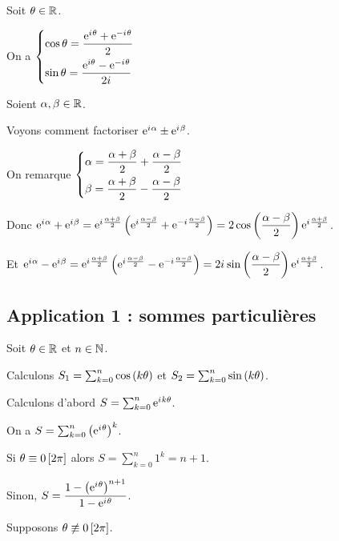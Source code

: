 \begin{prop}
Soit \(\theta\in\mathbb{R}\).

On a \(\begin{dcases}\cos\theta=\dfrac{\mathrm{e}^{i\mkern1mu\theta}+\mathrm{e}^{-i\mkern1mu\theta}}{2} \\ \sin\theta=\dfrac{\mathrm{e}^{i\theta}-\mathrm{e}^{-i\mkern1mu\theta}}{2i\mkern1mu}\end{dcases}\)
\end{prop}

\begin{rem}
Soient \(\alpha,\beta\in\mathbb{R}\).

Voyons comment factoriser \(\mathrm{e}^{i\mkern1mu\alpha}\pm\mathrm{e}^{i\mkern1mu\beta}\).

On remarque \(\begin{dcases}\alpha=\dfrac{\alpha+\beta}{2}+\dfrac{\alpha-\beta}{2} \\ \beta=\dfrac{\alpha+\beta}{2}-\dfrac{\alpha-\beta}{2}\end{dcases}\)

Donc \(\mathrm{e}^{i\mkern1mu\alpha}+\mathrm{e}^{i\mkern1mu\beta}=\mathrm{e}^{i\mkern1mu\frac{\alpha+\beta}{2}}\left(\mathrm{e}^{i\mkern1mu\frac{\alpha-\beta}{2}}+\mathrm{e}^{-i\mkern1mu\frac{\alpha-\beta}{2}}\right)=2\cos\left(\dfrac{\alpha-\beta}{2}\right)\mathrm{e}^{i\mkern1mu\frac{\alpha+\beta}{2}}\).

Et \(\mathrm{e}^{i\mkern1mu\alpha}-\mathrm{e}^{i\mkern1mu\beta}=\mathrm{e}^{i\mkern1mu\frac{\alpha+\beta}{2}}\left(\mathrm{e}^{i\mkern1mu\frac{\alpha-\beta}{2}}-\mathrm{e}^{-i\mkern1mu\frac{\alpha-\beta}{2}}\right)=2i\mkern1mu\sin\left(\dfrac{\alpha-\beta}{2}\right)\mathrm{e}^{i\mkern1mu\frac{\alpha+\beta}{2}}\).
\end{rem}

\subsection{Application 1 : sommes particulières}

Soit \(\theta\in\mathbb{R}\) et \(n\in\mathbb{N}\).

Calculons \(S_1=\sum_{k=0}^n\cos\left(k\theta\right)\) et \(S_2=\sum_{k=0}^n\sin\left(k\theta\right)\).

Calculons d'abord \(S=\sum_{k=0}^n\mathrm{e}^{i\mkern1mu k\theta}\).

On a \(S=\sum_{k=0}^n\left(\mathrm{e}^{i\mkern1mu\theta}\right)^k\).

Si \(\theta\equiv0\left[2\pi\right]\) alors \(S=\sum_{k=0}^n1^k=n+1\).

Sinon, \(S=\dfrac{1-\left(\mathrm{e}^{i\mkern1mu\theta}\right)^{n+1}}{1-\mathrm{e}^{i\mkern1mu\theta}}\).

Supposons \(\theta\not\equiv0\left[2\pi\right]\).

